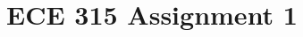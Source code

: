 \documentclass[letterpaper]{article}
\title{ECE 315 Assignment 1}
\author{\me}
\begin{document}
\maketitle

\section{}


\section{}


\section{}


\section{}


\section{}


\section{}


\section{}


\section{}


\section{}

\end{document}
